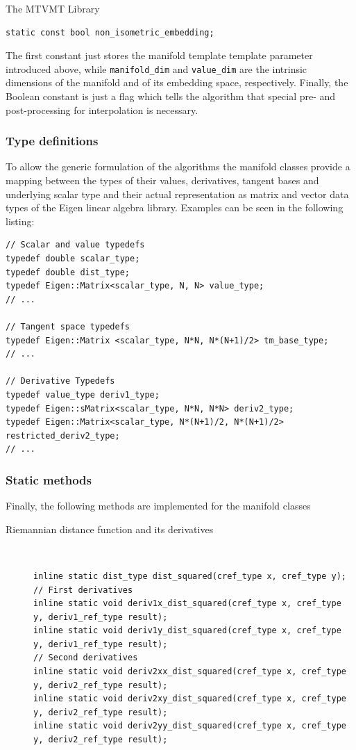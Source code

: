 \begin{chapter}{The MTVMT Library}
\begin{lstlisting}
static const bool non_isometric_embedding;
\end{lstlisting}
The first constant just stores the manifold template template parameter introduced above, while \texttt{manifold\_dim} and \texttt{value\_dim} are the intrinsic dimensions of the manifold
and of its embedding space, respectively. Finally, the Boolean constant is just a flag which tells the algorithm that special pre- and post-processing for interpolation is necessary.\\

\subsubsection{Type definitions} %
\label{ssub:Type definitions}
To allow the generic formulation of the algorithms the manifold classes provide a mapping between the types of their values, derivatives, tangent bases and underlying scalar type and their 
actual representation as matrix and vector data types of the Eigen linear algebra library. Examples can be seen in the following listing:

\cppinline
\begin{lstlisting}
// Scalar and value typedefs
typedef double scalar_type;
typedef double dist_type;
typedef Eigen::Matrix<scalar_type, N, N> value_type;
// ...

// Tangent space typedefs
typedef Eigen::Matrix <scalar_type, N*N, N*(N+1)/2> tm_base_type;
// ...

// Derivative Typedefs
typedef value_type deriv1_type;
typedef Eigen::sMatrix<scalar_type, N*N, N*N> deriv2_type;
typedef Eigen::Matrix<scalar_type, N*(N+1)/2, N*(N+1)/2> restricted_deriv2_type;
// ...
\end{lstlisting}

\subsubsection{Static methods} %
\label{ssub:Static methods}
Finally, the following methods are implemented for the manifold classes

\begin{description}
    
    \item[Riemannian distance function and its derivatives] \hfill \\
	\cppinline
	\begin{lstlisting}
inline static dist_type dist_squared(cref_type x, cref_type y);
// First derivatives	    
inline static void deriv1x_dist_squared(cref_type x, cref_type y, deriv1_ref_type result);
inline static void deriv1y_dist_squared(cref_type x, cref_type y, deriv1_ref_type result);
// Second derivatives
inline static void deriv2xx_dist_squared(cref_type x, cref_type y, deriv2_ref_type result);
inline static void deriv2xy_dist_squared(cref_type x, cref_type y, deriv2_ref_type result);
inline static void deriv2yy_dist_squared(cref_type x, cref_type y, deriv2_ref_type result);
	\end{lstlisting}
    

\end{description}
\end{chapter}
